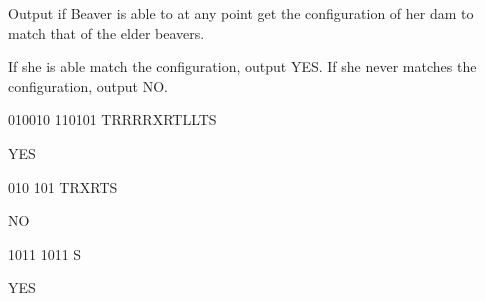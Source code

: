 \begin{formalout}
Output if Beaver is able to at any point get the configuration of her dam to match that of the elder beavers.

If she is able match the configuration, output YES. 
If she never matches the configuration, output NO.
\end{formalout}

\begin{datain}
010010
110101
TRRRRXRTLLTS
\end{datain}
\begin{dataout}
YES
\end{dataout}

\begin{datain}
010
101
TRXRTS
\end{datain}
\begin{dataout}
NO
\end{dataout}

\begin{datain}
1011
1011
S
\end{datain}
\begin{dataout}
YES
\end{dataout}
